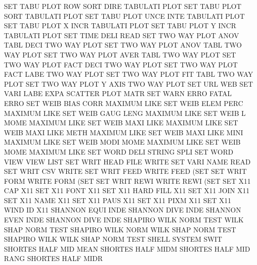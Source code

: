 SET      TABU PLOT ROW  SORT DIRE       TABULATI PLOT
SET      TABU PLOT SORT                 TABULATI PLOT
SET      TABU PLOT UNCE INTE            TABULATI PLOT
SET      TABU PLOT X    INCR            TABULATI PLOT
SET      TABU PLOT Y    INCR            TABULATI PLOT
SET      TIME DELI                      READ
SET      TWO  WAY  PLOT ANOV TABL DECI  TWO      WAY  PLOT
SET      TWO  WAY  PLOT ANOV TABL       TWO      WAY  PLOT
SET      TWO  WAY  PLOT AVER TABL       TWO      WAY  PLOT
SET      TWO  WAY  PLOT FACT DECI       TWO      WAY  PLOT
SET      TWO  WAY  PLOT FACT LABE       TWO      WAY  PLOT
SET      TWO  WAY  PLOT FIT  TABL       TWO      WAY  PLOT
SET      TWO  WAY  PLOT Y    AXIS       TWO      WAY  PLOT
SET      URL                            WEB
SET      VARI LABE EXPA                 SCATTER  PLOT MATR
SET      WARN ERRO                      FATAL    ERRO
SET      WEIB BIAS CORR                 MAXIMUM  LIKE
SET      WEIB ELEM PERC                 MAXIMUM  LIKE
SET      WEIB GAUG LENG                 MAXIMUM  LIKE
SET      WEIB L    MOME                 MAXIMUM  LIKE
SET      WEIB MAXI LIKE                 MAXIMUM  LIKE
SET      WEIB MAXI LIKE METH            MAXIMUM  LIKE
SET      WEIB MAXI LIKE MINI            MAXIMUM  LIKE
SET      WEIB MODI MOME                 MAXIMUM  LIKE
SET      WEIB MOME                      MAXIMUM  LIKE
SET      WORD DELI                      STRING   SPLI
SET      WORD VIEW VIEW                 LIST
SET      WRIT HEAD FILE                 WRITE
SET      VARI NAME                      READ
SET      WRIT CSV                       WRITE
SET      WRIT FEED                      WRITE    FEED (SET
SET      WRIT FORM                      WRITE    FORM (SET
SET      WRIT REWI                      WRITE    REWI (SET
SET      X11  CAP                       X11
SET      X11  FONT                      X11
SET      X11  HARD FILL                 X11
SET      X11  JOIN                      X11
SET      X11  NAME                      X11
SET      X11  PAUS                      X11
SET      X11  PIXM                      X11
SET      X11  WIND ID                   X11
SHANNON  EQUI INDE                      SHANNON  DIVE INDE
SHANNON  EVEN INDE                      SHANNON  DIVE INDE
SHAPIRO  WILK NORM TEST                 WILK     SHAP NORM TEST
SHAPIRO  WILK NORM                      WILK     SHAP NORM TEST
SHAPIRO  WILK                           WILK     SHAP NORM TEST
SHELL                                   SYSTEM   SWIT
SHORTES  HALF MID  MEAN                 SHORTES  HALF MIDM
SHORTES  HALF MID  RANG                 SHORTES  HALF MIDR
